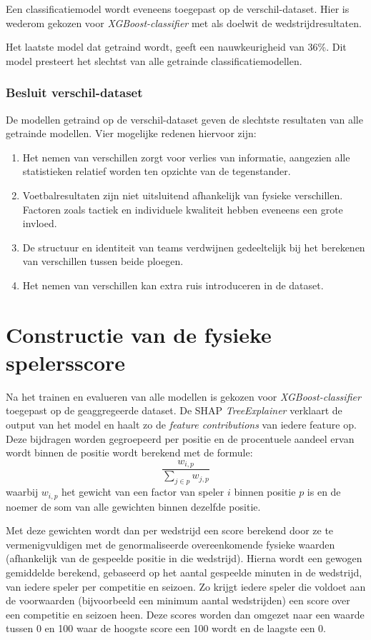 Een classificatiemodel wordt eveneens toegepast op de verschil-dataset. Hier is wederom gekozen voor \emph{XGBoost-classifier} met als doelwit de wedstrijdresultaten.

Het laatste model dat getraind wordt, geeft een nauwkeurigheid van 36\%. Dit model presteert het slechtst van alle getrainde classificatiemodellen.

\subsubsection{Besluit verschil-dataset} 

De modellen getraind op de verschil-dataset geven de slechtste resultaten van alle getrainde modellen. Vier mogelijke redenen hiervoor zijn:
\begin{enumerate}
    \item Het nemen van verschillen zorgt voor verlies van informatie, aangezien alle statistieken relatief worden ten opzichte van de tegenstander.
    \item Voetbalresultaten zijn niet uitsluitend afhankelijk van fysieke verschillen. Factoren zoals tactiek en individuele kwaliteit hebben eveneens een grote invloed.
    \item De structuur en identiteit van teams verdwijnen gedeeltelijk bij het berekenen van verschillen tussen beide ploegen.
    \item Het nemen van verschillen kan extra ruis introduceren in de dataset.
\end{enumerate} 

\section{Constructie van de fysieke spelersscore}

Na het trainen en evalueren van alle modellen is gekozen voor \emph{XGBoost-classifier}  toegepast op de geaggregeerde dataset. De SHAP \emph{TreeExplainer} verklaart de output van het model en haalt zo de \emph{feature contributions} van iedere feature op. Deze bijdragen worden gegroepeerd per positie en de procentuele aandeel ervan wordt binnen de positie wordt berekend met de formule:
 \[\frac{w_{i,p}}{\sum_{j \in p} w_{j,p}}\]
 waarbij \( w_{i,p} \) het gewicht van een factor van speler \( i \) binnen positie \(p\) is en de noemer de som van alle gewichten binnen dezelfde positie.

 Met deze gewichten wordt dan per wedstrijd een score berekend door ze te vermenigvuldigen met de genormaliseerde overeenkomende fysieke waarden (afhankelijk van de gespeelde positie in die wedstrijd). Hierna wordt een gewogen gemiddelde berekend, gebaseerd op het aantal gespeelde minuten in de wedstrijd, van iedere speler per competitie en seizoen.
 Zo krijgt iedere speler die voldoet aan de voorwaarden (bijvoorbeeld een minimum aantal wedstrijden) een score over een competitie en seizoen heen. Deze scores worden dan omgezet naar een waarde tussen 0 en 100 waar de hoogste score een 100 wordt en de laagste een 0.

